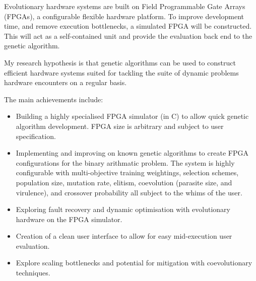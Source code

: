 Evolutionary hardware systems are built on Field Programmable Gate Arrays (FPGAs),
a configurable flexible hardware platform.
To improve development
time, and remove execution bottlenecks, a simulated FPGA will be constructed.
This will act as a self-contained unit and provide the evaluation back end to the genetic algorithm.

My research hypothesis is that genetic algorithms can be used to construct
efficient hardware systems suited for tackling the suite of dynamic problems
hardware encounters on a regular basis.

The main achievements include:
\begin{itemize}
	\item Building a highly specialised FPGA simulator (in C) to allow quick
		genetic algorithm development. FPGA size is arbitrary and subject to
		user specification.
	\item Implementing and improving on known genetic algorithms to
		create FPGA configurations for the binary arithmatic problem. The system is
		highly configurable with multi-objective training weightings, selection schemes,
		population size, mutation rate, elitism, coevolution (parasite size, and virulence),
		and crossover probability all subject to the whims of the user.
	\item Exploring fault recovery and dynamic optimisation with evolutionary
		hardware on the FPGA simulator.
	\item Creation of a clean user interface to allow for easy mid-execution user
		evaluation.
	\item Explore scaling bottlenecks and potential for mitigation with coevolutionary
		techniques.
\end{itemize}

